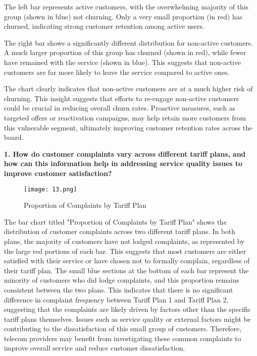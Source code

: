 \documentclass[12pt]{article}
\begin{document}
The left bar represents active customers, with the overwhelming majority of this group (shown in blue) not churning. Only a very small proportion (in red) has churned, indicating strong customer retention among active users.

The right bar shows a significantly different distribution for non-active customers. A much larger proportion of this group has churned (shown in red), while fewer have remained with the service (shown in blue). This suggests that non-active customers are far more likely to leave the service compared to active ones.

The chart clearly indicates that non-active customers are at a much higher risk of churning. This insight suggests that efforts to re-engage non-active customers could be crucial in reducing overall churn rates. Proactive measures, such as targeted offers or reactivation campaigns, may help retain more customers from this vulnerable segment, ultimately improving customer retention rates across the board.

\vspace{0.5cm}
\textbf{1. How do customer complaints vary across different tariff plans, and how can this information help in addressing service quality issues to improve customer satisfaction?}
\begin{figure}[h]
    \centering
    \texttt{[image: 13.png]}  
    \caption{Proportion of Complaints by Tariff Plan}
\end{figure}
\FloatBarrier
The bar chart titled "Proportion of Complaints by Tariff Plan" shows the distribution of customer complaints across two different tariff plans. In both plans, the majority of customers have not lodged complaints, as represented by the large red portions of each bar. This suggests that most customers are either satisfied with their service or have chosen not to formally complain, regardless of their tariff plan. The small blue sections at the bottom of each bar represent the minority of customers who did lodge complaints, and this proportion remains consistent between the two plans. This indicates that there is no significant difference in complaint frequency between Tariff Plan 1 and Tariff Plan 2, suggesting that the complaints are likely driven by factors other than the specific tariff plans themselves. Issues such as service quality or external factors might be contributing to the dissatisfaction of this small group of customers. Therefore, telecom providers may benefit from investigating these common complaints to improve overall service and reduce customer dissatisfaction.
\end{document}
